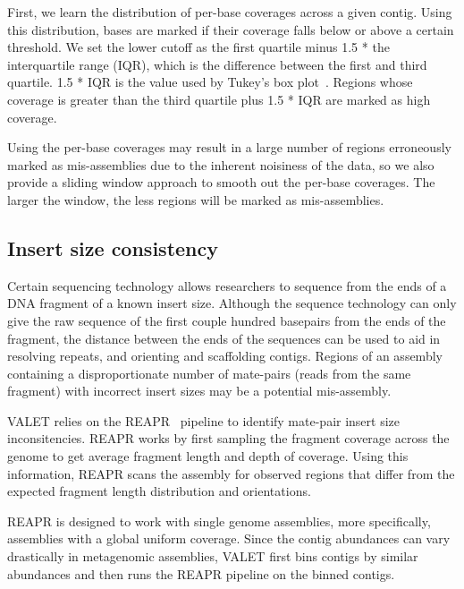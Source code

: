 First, we learn the distribution of per-base coverages across a given contig.  Using this distribution, bases are marked if their coverage falls below or above a certain threshold.  We set the lower cutoff as the first quartile minus 1.5 * the interquartile range (IQR), which is the difference between the first and third quartile. 1.5 * IQR is the value used by Tukey’s box plot~\cite{mcgill1978variations}.  Regions whose coverage is greater than the third quartile plus 1.5 * IQR are marked as high coverage.

Using the per-base coverages may result in a large number of regions erroneously marked as mis-assemblies due to the inherent noisiness of the data, so we also provide a sliding window approach to smooth out the per-base coverages.  The larger the window, the less regions will be marked as mis-assemblies.

\subsection{Insert size consistency}
Certain sequencing technology allows researchers to sequence from the ends of a DNA fragment of a known insert size.  Although the sequence technology can only give the raw sequence of the first couple hundred basepairs from the ends of the fragment, the distance between the ends of the sequences can be used to aid in resolving repeats, and orienting and scaffolding contigs.  Regions of an assembly containing a disproportionate number of mate-pairs (reads from the same fragment) with incorrect insert sizes may be a potential mis-assembly.

VALET relies on the REAPR~\cite{hunt2013reapr} pipeline to identify mate-pair insert size inconsitencies.  REAPR works by first sampling the fragment coverage across the genome to get average fragment length and depth of coverage.  Using this information, REAPR scans the assembly for observed regions that differ from the expected fragment length distribution and orientations.

REAPR is designed to work with single genome assemblies, more specifically, assemblies with a global uniform coverage.  Since the contig abundances can vary drastically in metagenomic assemblies, VALET first bins contigs by similar abundances and then runs the REAPR pipeline on the binned contigs.

